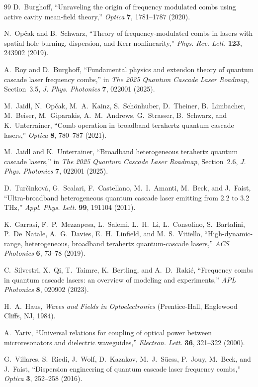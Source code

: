 \documentclass[11pt,letterpaper]{article}
\begin{document}
\begin{thebibliography}{99}
D.~Burghoff, ``Unraveling the origin of frequency modulated combs using active cavity mean-field theory,'' \textit{Optica} \textbf{7}, 1781--1787 (2020).

N.~Op\v{c}ak and B.~Schwarz, ``Theory of frequency-modulated combs in lasers with spatial hole burning, dispersion, and Kerr nonlinearity,'' \textit{Phys. Rev. Lett.} \textbf{123}, 243902 (2019).

A.~Roy and D.~Burghoff, ``Fundamental physics and extendon theory of quantum cascade laser frequency combs,'' in \textit{The 2025 Quantum Cascade Laser Roadmap}, Section~3.5, \textit{J. Phys. Photonics} \textbf{7}, 022001 (2025).

M.~Jaidl, N.~Op\v{c}ak, M.~A.~Kainz, S.~Sch\"onhuber, D.~Theiner, B.~Limbacher, M.~Beiser, M.~Giparakis, A.~M.~Andrews, G.~Strasser, B.~Schwarz, and K.~Unterrainer, ``Comb operation in broadband terahertz quantum cascade lasers,'' \textit{Optica} \textbf{8}, 780--787 (2021).

M.~Jaidl and K.~Unterrainer, ``Broadband heterogeneous terahertz quantum cascade lasers,'' in \textit{The 2025 Quantum Cascade Laser Roadmap}, Section~2.6, \textit{J. Phys. Photonics} \textbf{7}, 022001 (2025).

D.~Tur\v{c}inkov\'a, G.~Scalari, F.~Castellano, M.~I.~Amanti, M.~Beck, and J.~Faist, ``Ultra-broadband heterogeneous quantum cascade laser emitting from 2.2 to 3.2 THz,'' \textit{Appl. Phys. Lett.} \textbf{99}, 191104 (2011).

K.~Garrasi, F.~P.~Mezzapesa, L.~Salemi, L.~H.~Li, L.~Consolino, S.~Bartalini, P.~De~Natale, A.~G.~Davies, E.~H.~Linfield, and M.~S.~Vitiello, ``High-dynamic-range, heterogeneous, broadband terahertz quantum-cascade lasers,'' \textit{ACS Photonics} \textbf{6}, 73--78 (2019).

C.~Silvestri, X.~Qi, T.~Taimre, K.~Bertling, and A.~D.~Raki\'c, ``Frequency combs in quantum cascade lasers: an overview of modeling and experiments,'' \textit{APL Photonics} \textbf{8}, 020902 (2023).

H.~A.~Haus, \textit{Waves and Fields in Optoelectronics} (Prentice-Hall, Englewood Cliffs, NJ, 1984).

A.~Yariv, ``Universal relations for coupling of optical power between microresonators and dielectric waveguides,'' \textit{Electron. Lett.} \textbf{36}, 321--322 (2000).

G.~Villares, S.~Riedi, J.~Wolf, D.~Kazakov, M.~J.~S\"uess, P.~Jouy, M.~Beck, and J.~Faist, ``Dispersion engineering of quantum cascade laser frequency combs,'' \textit{Optica} \textbf{3}, 252--258 (2016).

\end{thebibliography}
\end{document}
